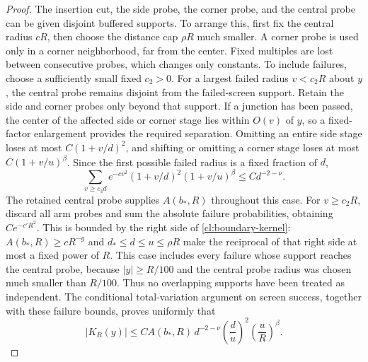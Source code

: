 \begin{proof}
The insertion cut, the side probe, the corner probe, and the
central probe can be given disjoint buffered supports. To arrange
this, first fix the central radius $cR$, then choose the distance
cap $\rho R$ much smaller. A corner probe is used only in a
corner neighborhood, far from the center. Fixed multiples are
lost between consecutive probes, which changes only constants.
To include failures, choose a sufficiently small fixed $c_2>0$.
For a largest failed radius $v<c_2R$ about $y$, the central
probe remains disjoint from the failed-screen support. Retain
the side and corner probes only beyond that support. If a
junction has been passed, the center of the affected side or
corner stage lies within $O(v)$ of $y$, so a fixed-factor
enlargement provides the required separation. Omitting an entire
side stage loses at most $C(1+v/d)^2$, and shifting or omitting
a corner stage loses at most $C(1+v/u)^\beta$. Since the first
possible failed radius is a fixed fraction of $d$,
\[
 \sum_{v\ge c_3d}e^{-cv^2}(1+v/d)^2(1+v/u)^\beta
 \le Cd^{-2-\nu}.
\]
The retained central probe supplies $A(b_*,R)$ throughout this
case. For $v\ge c_2R$, discard all arm probes and sum the
absolute failure probabilities, obtaining $Ce^{-c'R^2}$.
This is bounded by the right side of \eqref{cl:boundary-kernel}:
$A(b_*,R)\ge cR^{-g}$ and
$d_*\le d\le u\le\rho R$ make the reciprocal of that right
side at most a fixed power of $R$. This case includes every
failure whose support reaches the central probe, because
$|y|\ge R/100$ and the central probe radius was chosen much
smaller than $R/100$.
Thus no overlapping supports have been treated as independent.
The conditional total-variation argument on screen success,
together with these failure bounds, proves uniformly that
\begin{equation}\label{cl:boundary-kernel}
 |K_R(y)|\le C A(b_*,R)\,
     d^{-2-\nu}\left(\frac d u\right)^2
                    \left(\frac u R\right)^\beta.
\end{equation}


\end{proof}
